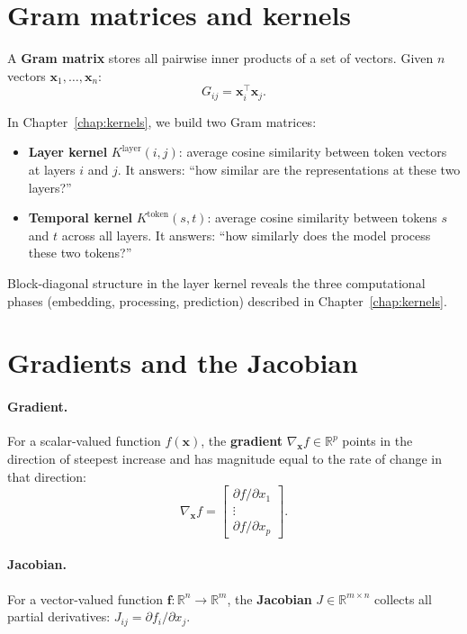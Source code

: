 \documentclass[11pt, twoside, openright]{memoir}
\begin{document}
\section{Gram matrices and kernels}

A \textbf{Gram matrix} stores all pairwise inner products of a set of
vectors.  Given $n$ vectors $\mathbf{x}_1,\ldots,\mathbf{x}_n$:
\[
  G_{ij} = \mathbf{x}_i^\top \mathbf{x}_j.
\]

In Chapter~\ref{chap:kernels}, we build two Gram matrices:
\begin{itemize}[nosep]
  \item \textbf{Layer kernel} $K^{\mathrm{layer}}(i,j)$: average cosine
    similarity between token vectors at layers $i$ and $j$.  It answers:
    ``how similar are the representations at these two layers?''
  \item \textbf{Temporal kernel} $K^{\mathrm{token}}(s,t)$: average cosine
    similarity between tokens $s$ and $t$ across all layers.  It answers:
    ``how similarly does the model process these two tokens?''
\end{itemize}
Block-diagonal structure in the layer kernel reveals the three computational
phases (embedding, processing, prediction) described in
Chapter~\ref{chap:kernels}.

\section{Gradients and the Jacobian}

\paragraph{Gradient.}
For a scalar-valued function $f(\mathbf{x})$, the \textbf{gradient}
$\nabla_{\mathbf{x}} f \in \mathbb{R}^p$ points in the direction of
steepest increase and has magnitude equal to the rate of change in that
direction:
\[
  \nabla_{\mathbf{x}} f =
  \begin{bmatrix}
    \partial f / \partial x_1 \\ \vdots \\ \partial f / \partial x_p
  \end{bmatrix}.
\]

\paragraph{Jacobian.}
For a vector-valued function $\mathbf{f}: \mathbb{R}^n \to \mathbb{R}^m$,
the \textbf{Jacobian} $J \in \mathbb{R}^{m \times n}$ collects all partial
derivatives: $J_{ij} = \partial f_i / \partial x_j$.
\end{document}
